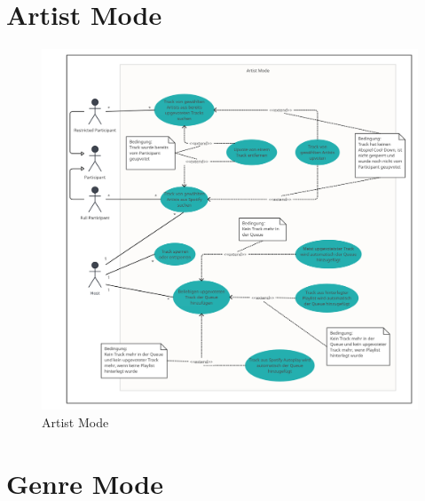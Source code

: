 \documentclass[oneside, ngerman]{sdqtechreport}
\begin{document}
\newpage

\section{Artist Mode}
\label{sec:Anwendungsfälle:Artist Mode}
\hypertarget{Artist Mode}{}

\begin{figure}[h]
    \includegraphics[width = 16cm]{LATEX/Pflichtenheft/GraphicDesigns/Use Case Artist Mode.png}
    \caption{Artist Mode}
    \label{fig:Use Case Artist Mode}
\end{figure}

\newpage

\section{Genre Mode}
\label{sec:Anwendungsfälle:Genre Mode}
\hypertarget{Genre Mode}{}
\end{document}
